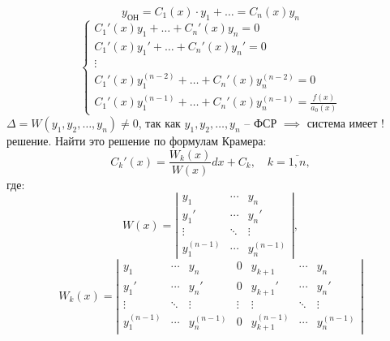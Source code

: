\documentclass[11pt,a4paper,oneside]{report}
\theoremstyle{definition}
\theoremstyle{plain}
\theoremstyle{remark}
\begin{document}
\begin{equation*}
    y_{\text{ОН}} = C_1(x) \cdot y_1 + \ldots = C_n(x)y_n
\end{equation*}
\begin{equation*}
    \left\{\begin{array}{l}
        C_1'(x)y_1 + \ldots + C_n'(x)y_n = 0                 \\
        C_1'(x)y_1' + \ldots + C_n'(x)y_n' = 0               \\
        \vdots                                               \\
        C_1'(x)y_1^{(n-2)} + \ldots + C_n'(x)y_n^{(n-2)} = 0 \\
        C_1'(x)y_1^{(n-1)} + \ldots + C_n'(x)y_n^{(n-1)} = \frac{f(x)}{a_0(x)}
    \end{array}\right.
\end{equation*}
$\Delta = W(y_1,y_2,\ldots,y_n) \ne 0$, так как $y_1,y_2,\ldots,y_n$ -- ФСР $\implies$ система имеет $!$ решение. Найти это решение по формулам Крамера:
\begin{equation}\label{eq38}
    C_k'(x) = \frac{W_k(x)}{W(x)}dx + C_k, \quad k = \overline{1,n},
\end{equation}
где:
\begin{equation*}
    W(x) = \left|\begin{matrix}
        y_1         & \cdots & y_n         \\
        y_1'        & \cdots & y_n'        \\
        \vdots      & \ddots & \vdots      \\
        y_1^{(n-1)} & \cdots & y_n^{(n-1)}
    \end{matrix}\right|,
\end{equation*}
\begin{equation*}
    W_k(x) = \left|\begin{matrix}
        y_1         & \cdots & y_n         & 0      & y_{k+1}         & \cdots & y_n         \\
        y_1'        & \cdots & y_n'        & 0      & y_{k+1}'        & \cdots & y_n'        \\
        \vdots      & \ddots & \vdots      & \vdots & \vdots          & \ddots & \vdots      \\
        y_1^{(n-1)} & \cdots & y_n^{(n-1)} & 0      & y_{k+1}^{(n-1)} & \cdots & y_n^{(n-1)}
    \end{matrix}\right|
\end{equation*}
\end{document}

